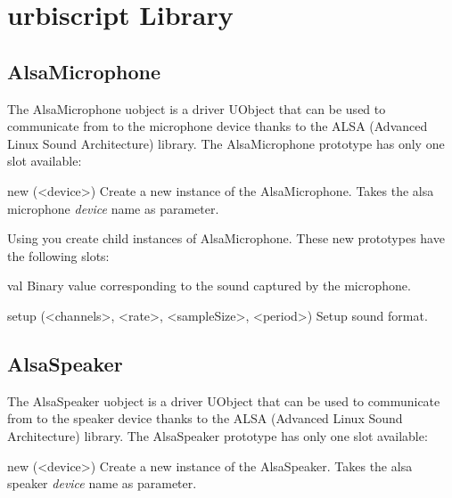 \chapter{urbiscript Library}

\section{AlsaMicrophone}

The AlsaMicrophone uobject is a driver UObject that can be used to
communicate from \us to the microphone device thanks to the ALSA (Advanced
Linux Sound Architecture) library.
The AlsaMicrophone prototype has only one slot available:

\begin{urbiscriptapi}
\item[new](<device>) Create a new instance of the AlsaMicrophone. Takes the
  alsa microphone \textit{device} name as parameter.
\end{urbiscriptapi}

Using  you create child instances of AlsaMicrophone. These new prototypes have the following slots:

\begin{urbiscriptapi}
\item[val] Binary value corresponding to the sound captured by the
  microphone.
\item[setup](<channels>, <rate>, <sampleSize>, <period>) Setup sound format.
\end{urbiscriptapi}

\section{AlsaSpeaker}

The AlsaSpeaker uobject is a driver UObject that can be used to communicate
from \us to the speaker device thanks to the ALSA (Advanced Linux Sound
Architecture) library.
The AlsaSpeaker prototype has only one slot available:

\begin{urbiscriptapi}
\item[new](<device>) Create a new instance of the AlsaSpeaker. Takes the
  alsa speaker \textit{device} name as parameter.
\end{urbiscriptapi}

